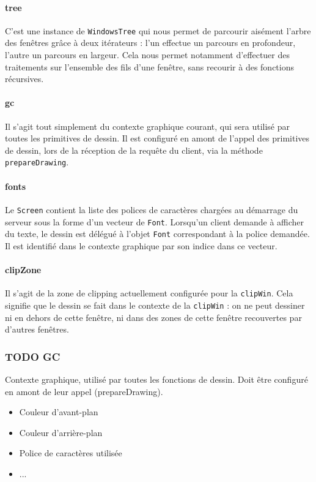 \paragraph{tree}
C'est une instance de \verb|WindowsTree| qui nous permet de parcourir aisément l'arbre des fenêtres grâce à deux itérateurs : l'un effectue un parcours en profondeur, l'autre un parcours en largeur. Cela nous permet notamment d'effectuer des traitements sur l'ensemble des fils d'une fenêtre, sans recourir à des fonctions récursives.

\paragraph{gc}
Il s'agit tout simplement du contexte graphique courant, qui sera utilisé par toutes les primitives de dessin. Il est configuré en amont de l'appel des primitives de dessin, lors de la réception de la requête du client, via la méthode \verb|prepareDrawing|.

\paragraph{fonts}
Le \verb|Screen| contient la liste des polices de caractères chargées au démarrage du serveur sous la forme d'un vecteur de \verb|Font|. Lorsqu'un client demande à afficher du texte, le dessin est délégué à l'objet \verb|Font| correspondant à la police demandée. Il est identifié dans le contexte graphique par son indice dans ce vecteur.

\paragraph{clipZone}
Il s'agit de la zone de clipping actuellement configurée pour la \verb|clipWin|. Cela signifie que le dessin se fait dans le contexte de la \verb|clipWin| : on ne peut dessiner ni en dehors de cette fenêtre, ni dans des zones de cette fenêtre recouvertes par d'autres fenêtres.

\subsubsection{TODO GC}
Contexte graphique, utilisé par toutes les fonctions de dessin. Doit être configuré en amont de leur appel (prepareDrawing).
\begin{itemize}
  \item Couleur d'avant-plan
  \item Couleur d'arrière-plan
  \item Police de caractères utilisée
  \item ...
\end{itemize}

